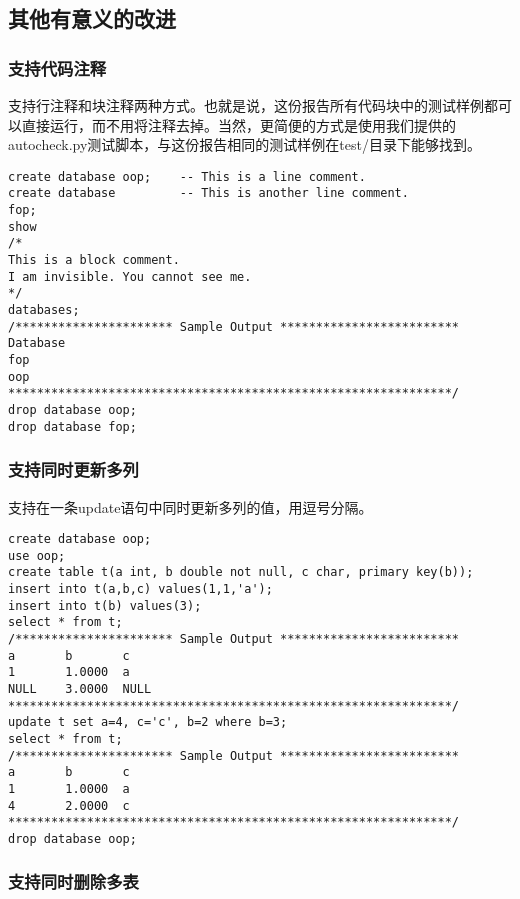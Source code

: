 \documentclass[12pt,a4paper]{article}
\begin{document}
\subsection{其他有意义的改进}

\subsubsection{支持代码注释}

支持行注释和块注释两种方式。也就是说，这份报告所有代码块中的测试样例都可以直接运行，而不用将注释去掉。当然，更简便的方式是使用我们提供的autocheck.py测试脚本，与这份报告相同的测试样例在test/目录下能够找到。

\begin{lstlisting}
create database oop;    -- This is a line comment. 
create database         -- This is another line comment. 
fop;
show
/*
This is a block comment. 
I am invisible. You cannot see me. 
*/
databases; 
/********************** Sample Output *************************
Database
fop
oop
**************************************************************/
drop database oop;
drop database fop;
\end{lstlisting}

\subsubsection{支持同时更新多列}

支持在一条update语句中同时更新多列的值，用逗号分隔。

\begin{lstlisting}
create database oop;
use oop;
create table t(a int, b double not null, c char, primary key(b)); 
insert into t(a,b,c) values(1,1,'a'); 
insert into t(b) values(3); 
select * from t; 
/********************** Sample Output *************************
a       b       c       
1       1.0000  a       
NULL    3.0000  NULL   
**************************************************************/
update t set a=4, c='c', b=2 where b=3; 
select * from t;
/********************** Sample Output *************************
a       b       c       
1       1.0000  a       
4       2.0000  c  
**************************************************************/
drop database oop; 
\end{lstlisting}

\subsubsection{支持同时删除多表}
\end{document}
